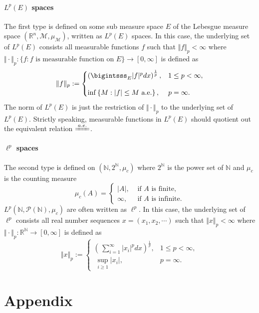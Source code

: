 \documentclass{report}
\theoremstyle{nonumberplain}
\begin{document}
\subsubsection{$L^p(E)$ spaces}
The first type is defined on some sub measure space $E$ of the Lebesgue measure space $(\mathbb{R}^n, \mathcal{M}, \mu_{\mathcal{M}})$, written as $L^p(E)$ spaces. In this case, the underlying set of $L^p(E)$ consists all measurable functions $f$ such that $\Vert f\Vert_p <\infty$ where $\Vert \cdot\Vert_p:\{f:f\text{ is measurable function on }E\}\to[0,\infty]$ is defined as
\[
	\Vert f\Vert_p:=
	\begin{cases}
		\left(\bigintsss_E |f|^pdx\right)^{\frac{1}{p}},&1\le p< \infty,\\[10pt]
		\inf \left\{M: |f|\le M\text{ a.e.}\right\},&p=\infty.
	\end{cases}	
\]
The norm of $L^p(E)$ is just the restriction of $\Vert \cdot\Vert_p$ to the underlying set of $L^p(E)$. Strictly speaking, measurable functions in $L^p(E)$ should quotient out the equivalent relation $\xlongequal{a.e.}$.
\subsubsection{$\ell^p$ spaces}
The second type is defined on $(\mathbb{N},2^\mathbb{N},\mu_c)$ where $2^\mathbb{N}$ is the power set of $\mathbb{N}$ and $\mu_c$ is the counting measure
\[
\mu_c(A)= 
\begin{cases}
	|A|, & \text { if } A \text { is finite}, \\
	\infty, & \text { if } A \text { is infinite}.
\end{cases}
\]
$L^p(\mathbb{N},\mathcal{P}(\mathbb{N}),\mu_c)$ are often written as $\ell^p$. In this case, the underlying set of $\ell^p$ consists all real number sequences $x=(x_1,x_2,\cdots)$ such that $\Vert x\Vert_p <\infty$ where $\Vert \cdot\Vert_p:\mathbb{R}^\mathbb{N}\to[0,\infty]$ is defined as
\[
	\Vert x\Vert_p:=
	\begin{cases}
		\left(\,\sum\limits_{i=1}^\infty |x_i|^pdx\right)^{\frac{1}{p}},&1\le p< \infty,\\[10pt]
		\;\sup\limits_{i\ge 1}|x_i|,&p=\infty.
	\end{cases}	
\]

\chapter*{Appendix}
\end{document}
